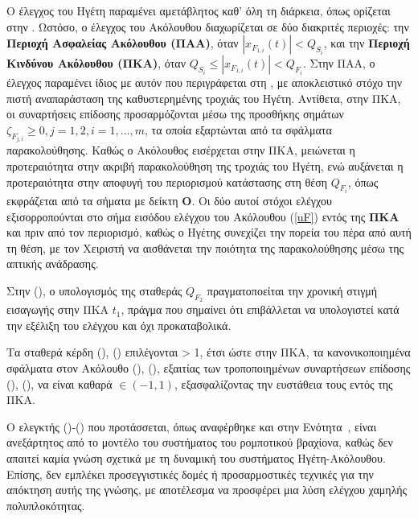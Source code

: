 \bigskip
\begin{observation} \label{obs:control:1}
Ο έλεγχος του Ηγέτη παραμένει αμετάβλητος καθ’ όλη τη διάρκεια, όπως ορίζεται στην \cite{BIKAS20239972}. Ωστόσο, ο έλεγχος του Ακόλουθου διαχωρίζεται σε δύο διακριτές περιοχές: την \textbf{Περιοχή Ασφαλείας Ακόλουθου (ΠΑΑ)}, όταν $|x_{F_{1, i}}(t)| < Q_{S_{i}}$, και την \textbf{Περιοχή Κινδύνου Ακόλουθου (ΠΚΑ)}, όταν $Q_{S_{i}} \leq |x_{F_{1, i}}(t)| < Q_{F_{i}}$. Στην ΠΑΑ, ο έλεγχος παραμένει ίδιος με αυτόν που περιγράφεται στη \cite{BIKAS20239972}, με αποκλειστικό στόχο την πιστή αναπαράσταση της καθυστερημένης τροχιάς του Ηγέτη. Αντίθετα, στην ΠΚΑ, οι συναρτήσεις επίδοσης προσαρμόζονται μέσω της προσθήκης σημάτων $\zeta_{F_{j, i}} \geq 0, j=1,2, i=1,...,m$, τα οποία εξαρτώνται από τα σφάλματα παρακολούθησης. Καθώς ο Ακόλουθος εισέρχεται στην ΠΚΑ, μειώνεται η προτεραιότητα στην ακριβή παρακολούθηση της τροχιάς του Ηγέτη, ενώ αυξάνεται η προτεραιότητα στην αποφυγή του περιορισμού κατάστασης στη θέση $Q_{F_{i}}$, όπως εκφράζεται από τα σήματα με δείκτη \textbf{O}. Οι δύο αυτοί στόχοι ελέγχου εξισορροπούνται στο σήμα εισόδου ελέγχου του Ακόλουθου (\ref{uF}) εντός της \textbf{ΠΚΑ} και πριν από τον περιορισμό, καθώς ο Ηγέτης συνεχίζει την πορεία του πέρα από αυτή τη θέση, με τον Χειριστή να αισθάνεται την ποιότητα της παρακολούθησης μέσω της απτικής ανάδρασης.
\end{observation}

\begin{observation} \label{obs:control:2}
Στην (), ο υπολογισμός της σταθεράς $Q_{F_{2}}$ πραγματοποείται την χρονική στιγμή εισαγωγής στην ΠΚΑ $t_1$, πράγμα που σημαίνει ότι επιβάλλεται να υπολογιστεί κατά την εξέλιξη του ελέγχου και όχι προκαταβολικά.
\end{observation}

\begin{observation} \label{obs:control:3}
Τα σταθερά κέρδη (), () επιλέγονται > 1, έτσι ώστε στην ΠΚΑ, τα κανονικοποιημένα σφάλματα στον Ακόλουθο (), (), εξαιτίας των τροποποιημένων συναρτήσεων επίδοσης (), (),  να είναι καθαρά $\in(-1, 1)$, εξασφαλίζοντας την ευστάθεια τους εντός της ΠΚΑ.
\end{observation}

\begin{observation} \label{obs:control:4}
Ο ελεγκτής ()-() που προτάσσεται, όπως αναφέρθηκε και στην Ενότητα~, είναι ανεξάρτητος από το μοντέλο του συστήματος του ρομποτικού βραχίονα, καθώς δεν απαιτεί καμία γνώση σχετικά με τη δυναμική του συστήματος Ηγέτη-Ακόλουθου. Επίσης, δεν εμπλέκει προσεγγιστικές δομές ή προσαρμοστικές τεχνικές για την απόκτηση αυτής της γνώσης, με αποτέλεσμα να προσφέρει μια λύση ελέγχου χαμηλής πολυπλοκότητας.
\end{observation}


